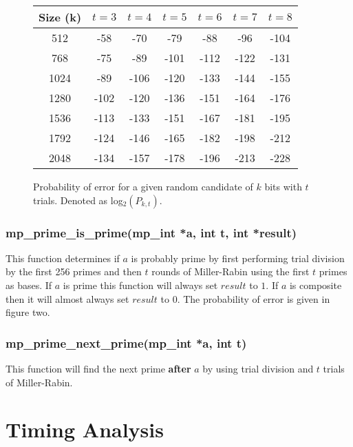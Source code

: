 \documentclass[]{article}
\begin{document}
\begin{figure}[here]
\begin{small}
\begin{center}
\begin{tabular}{|c|c|c|c|c|c|c|}
\hline \textbf{Size (k)} & \textbf{$t = 3$} & \textbf{$t = 4$} & \textbf{$t = 5$} & \textbf{$t = 6$} & \textbf{$t = 7$} & \textbf{$t = 8$}\\
\hline 512  & -58 & -70 & -79 & -88 & -96 & -104 \\
\hline 768  & -75 & -89 & -101 & -112 & -122 & -131\\
\hline 1024 & -89 & -106 & -120 & -133 & -144 & -155 \\
\hline 1280 & -102 & -120 & -136 & -151 & -164 & -176 \\
\hline 1536 & -113 & -133 & -151 & -167 & -181 & -195 \\
\hline 1792 & -124 & -146 & -165 & -182 & -198 & -212 \\
\hline 2048 & -134 & -157 & -178 & -196 & -213 & -228\\
\hline
\end{tabular}
\end{center}
\end{small}
\caption{Probability of error for a given random candidate of $k$ bits with $t$ trials.  Denoted as 
log$_2(P_{k,t})$. }
\end{figure}

\subsubsection{mp\_prime\_is\_prime(mp\_int *a, int t, int *result)}
This function determines if $a$ is probably prime by first performing trial division by the first 256 
primes and then $t$ rounds of Miller-Rabin using the first $t$ primes as bases.  If $a$ is prime this
function will always set $result$ to $1$.  If $a$ is composite then it will almost always set $result$
to $0$.  The probability of error is given in figure two.

\subsubsection{mp\_prime\_next\_prime(mp\_int *a, int t)}
This function will find the next prime \textbf{after} $a$ by using trial division and $t$ trials of 
Miller-Rabin.  

\section{Timing Analysis}
\end{document}
